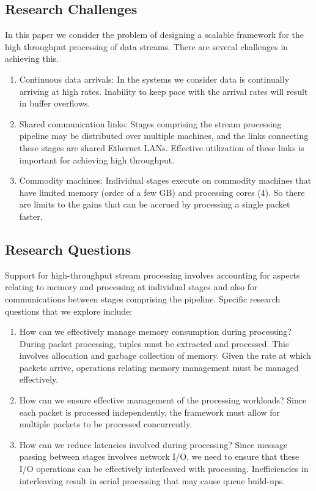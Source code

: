 \subsection{Research Challenges} 
In this paper we consider the problem of designing a scalable framework for the high throughput processing of data streams. There are several challenges in achieving this.
\begin{enumerate}
	\item Continuous data arrivals: In the systems we consider data is continually arriving at high rates. Inability to keep pace with the arrival rates will result in buffer overflows.
	\item Shared communication links: Stages comprising the stream processing pipeline may be distributed over multiple machines, and the links connecting these stages are shared Ethernet LANs. Effective utilization of these links is important for achieving high throughput.
	\item Commodity machines: Individual stages execute on commodity machines that have limited memory (order of a few GB) and processing cores (4).  So there are limits to the gains that can be accrued by processing a single packet faster.
\end{enumerate}

\subsection{Research Questions}
Support for high-throughput stream processing involves accounting for aspects relating to memory and processing at individual stages and also for communications between stages comprising the pipeline. Specific research questions that we explore include:
\begin{enumerate}
	\item How can we effectively manage memory consumption during processing? During packet processing, tuples must be extracted and processed. This involves allocation and garbage collection of memory. Given the rate at which packets arrive, operations relating memory management must be managed effectively.
	\item How can we ensure effective management of the processing workloads? Since each packet is processed independently, the framework must allow for multiple packets to be processed concurrently.
	\item How can we reduce latencies involved during processing? Since message passing between stages involves network I/O, we need to ensure that these I/O operations can be effectively interleaved with processing. Inefficiencies in interleaving result in serial processing that may cause queue build-ups.
\end{enumerate}

